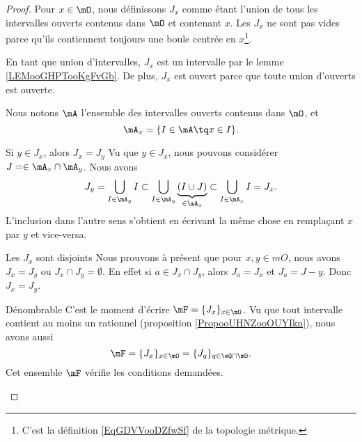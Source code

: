 \begin{proof}
    Pour \( x\in \mO\), nous définissons \( J_x\) comme étant l'union de tous les intervalles ouverts contenus dans \( \mO\) et contenant \( x\). Les $J_x$ ne sont pas vides parce qu'ils contiennent toujours une boule centrée en \( x\)\footnote{C'est la définition \ref{EqGDVVooDZfwSf} de la topologie métrique.}.
    
    En tant que union d'intervalles, \( J_x\) est un intervalle par le lemme \ref{LEMooGHPTooKgFvGb}. De plus, \( J_x\) est ouvert parce que toute union d'ouverts est ouverte.

    Nous notons \( \mA\) l'ensemble des intervalles ouverts contenus dans \( \mO\), et
    \begin{equation}
        \mA_x=\{ I\in\mA\tq x\in I \}.
    \end{equation}

    \begin{subproof}
        \item[Si \( y\in J_x\), alors \( J_x=J_y\)]
            Vu que \( y\in J_x\), nous pouvons considérer \( J=\in \mA_x\cap \mA_y\). Nous avons
            \begin{equation}
                J_y=\bigcup_{I\in\mA_y}I\subset \bigcup_{I\in \mA_y}\underbrace{(I\cup J)}_{\in\mA_x}\subset \bigcup_{I\in\mA_x}I=J_x.
            \end{equation}
            L'inclusion dans l'autre sens s'obtient en écrivant la même chose en remplaçant \( x\) par \( y\) et vice-versa.
        \item[Les \( J_x\) sont disjoints]
            Nous prouvons à présent que pour \( x,y\in mO\), nous avons \( J_x=J_y \) ou \( J_x\cap J_y=\emptyset\). En effet si \( a\in J_x\cap J_y\), alors \( J_a=J_x\) et \( J_a=J-y\). Donc \( J_x=J_y\).
        \item[Dénombrable]
            C'est le moment d'écrire $\mF=\{ J_x \}_{x\in \mO}$. Vu que tout intervalle contient au moins un rationnel (proposition \ref{PropooUHNZooOUYIkn}), nous avons aussi
            \begin{equation}
                \mF=\{ J_x \}_{x\in \mO}=\{ J_q \}_{q\in \eQ\cap\mO}.   
            \end{equation}
            Cet ensemble \( \mF\) vérifie les conditions demandées.
    \end{subproof}
\end{proof}

